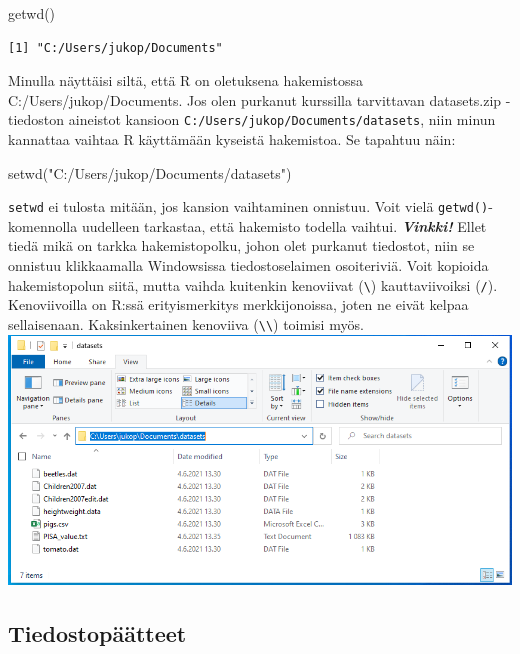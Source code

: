 \documentclass[
]{book}
\newenvironment{Shaded}{\begin{snugshade}}{\end{snugshade}}
\newcommand{\FunctionTok}[1]{\textcolor[rgb]{0.00,0.00,0.00}{#1}}
\newcommand{\NormalTok}[1]{#1}
\newcommand{\StringTok}[1]{\textcolor[rgb]{0.31,0.60,0.02}{#1}}
\begin{document}
\begin{Shaded}
\begin{Highlighting}[]
\FunctionTok{getwd}\NormalTok{()}
\end{Highlighting}
\end{Shaded}

\begin{verbatim}
[1] "C:/Users/jukop/Documents"
\end{verbatim}

Minulla näyttäisi siltä, että R on oletuksena hakemistossa C:/Users/jukop/Documents. Jos olen purkanut kurssilla tarvittavan datasets.zip -tiedoston aineistot kansioon \texttt{C:/Users/jukop/Documents/datasets}, niin minun kannattaa vaihtaa R käyttämään kyseistä hakemistoa. Se tapahtuu näin:

\begin{Shaded}
\begin{Highlighting}[]
\FunctionTok{setwd}\NormalTok{(}\StringTok{"C:/Users/jukop/Documents/datasets"}\NormalTok{)}
\end{Highlighting}
\end{Shaded}

\texttt{setwd} ei tulosta mitään, jos kansion vaihtaminen onnistuu. Voit vielä \texttt{getwd()}-komennolla uudelleen tarkastaa, että hakemisto todella vaihtui.
\textbf{\emph{Vinkki!}} Ellet tiedä mikä on tarkka hakemistopolku, johon olet purkanut tiedostot, niin se onnistuu klikkaamalla Windowsissa tiedostoselaimen osoiteriviä. Voit kopioida hakemistopolun siitä, mutta vaihda kuitenkin kenoviivat (\texttt{\textbackslash{}}) kauttaviivoiksi (\texttt{/}). Kenoviivoilla on R:ssä erityismerkitys merkkijonoissa, joten ne eivät kelpaa sellaisenaan. Kaksinkertainen kenoviiva (\texttt{\textbackslash{}\textbackslash{}}) toimisi myös.
\includegraphics{files/03-reading_data/windows_show_file_path2.png}

\hypertarget{tiedostopuxe4uxe4tteet}{%
\subsection{Tiedostopäätteet}\label{tiedostopuxe4uxe4tteet}}
\end{document}
